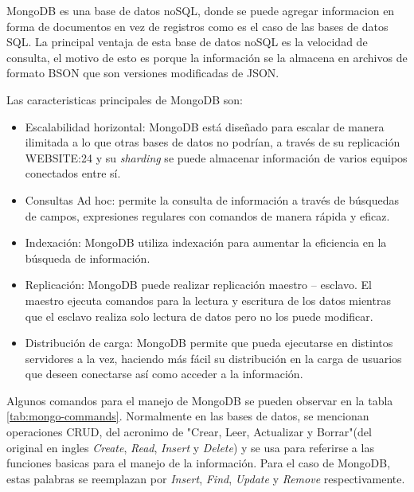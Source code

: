 MongoDB es una base de datos noSQL\citep{WEBSITE:22},  donde se puede agregar informacion en forma de documentos en vez de registros como es el caso de las bases de datos SQL\citep{WEBSITE:23}.  La principal ventaja de esta base de datos noSQL es la velocidad de consulta, el motivo de esto es porque la información se la almacena en archivos de formato BSON que son versiones modificadas de JSON. 

Las caracteristicas principales de MongoDB son:

\begin{itemize}
	\item Escalabilidad horizontal: MongoDB está diseñado para escalar de manera ilimitada a lo que otras bases de datos no podrían, a través de su replicación {WEBSITE:24} y su \textit{sharding}\citep{WEBSITE:25} se puede almacenar información de varios equipos conectados entre sí.
	
	\item Consultas Ad hoc: permite la consulta de información a través de búsquedas de campos,
expresiones regulares con comandos de manera rápida y eficaz.

	\item Indexación: MongoDB utiliza indexación para aumentar la eficiencia en la búsqueda de
información.

	\item Replicación: MongoDB puede realizar replicación maestro – esclavo. El maestro ejecuta comandos para la lectura y escritura de los datos mientras que el esclavo realiza solo lectura de datos pero no los puede modificar.
	
	\item Distribución de carga: MongoDB permite que pueda ejecutarse en distintos servidores a la vez, haciendo más fácil su distribución en la carga de usuarios que deseen conectarse así como acceder a la información. 
	
\end{itemize}




Algunos comandos para el manejo de MongoDB se pueden observar en la tabla \ref{tab:mongo-commands}.  Normalmente en las bases de datos, se mencionan operaciones CRUD,  del acronimo de "Crear, Leer, Actualizar y Borrar"(del original en ingles \textit{Create}, \textit{Read}, \textit{Insert} y \textit{Delete}) y se usa para referirse a las funciones basicas para el manejo de la información. Para el caso de MongoDB,  estas palabras se reemplazan por \textit{Insert}, \textit{Find}, \textit{Update} y \textit{Remove} respectivamente.

